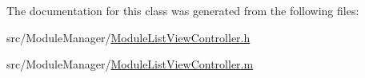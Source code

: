 The documentation for this class was generated from the following files\-:\begin{DoxyCompactItemize}
\item 
src/\-Module\-Manager/\hyperlink{_module_list_view_controller_8h}{Module\-List\-View\-Controller.\-h}\item 
src/\-Module\-Manager/\hyperlink{_module_list_view_controller_8m}{Module\-List\-View\-Controller.\-m}\end{DoxyCompactItemize}
